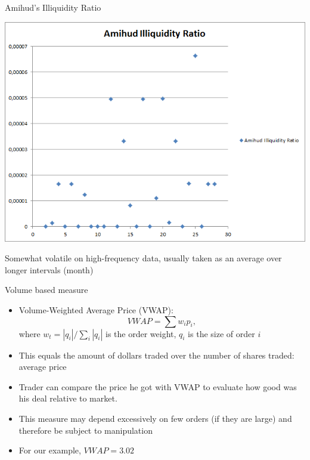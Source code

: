\documentclass[english,10pt
,aspectratio=169
]{beamer}
\begin{document}
\begin{frame}{Amihud's Illiquidity Ratio}
\begin{center}
	\includegraphics[scale=0.39]{pics/L2_Amihud}
\end{center}
Somewhat volatile on high-frequency data, usually taken as an average over longer intervals (month)
\end{frame}


\begin{frame}{Volume based measure}
\begin{itemize}
	\item \alert{Volume-Weighted Average Price} (VWAP):
	\[
	VWAP = \sum  w_i p_i,
	\]
	where $w_t = |q_i|/\sum_i |q_i|$ is the order weight, $q_i$ is the size of order $i$
	\item This equals the amount of dollars traded over the number of shares traded: average price
	\item Trader can compare the price he got with VWAP to evaluate how good was his deal relative to market.
	\item This measure may depend excessively on few orders (if they are large) and therefore be subject to manipulation
	\item For our example, $VWAP=3.02$
\end{itemize}
\end{frame}
\end{document}
